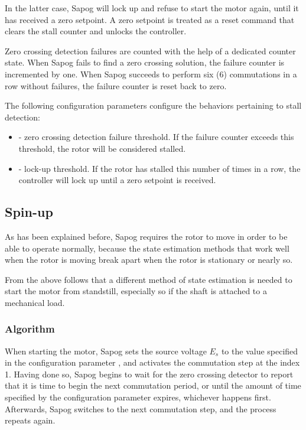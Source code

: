 \documentclass{zubaxdoc}
\begin{document}
In the latter case, Sapog will lock up and refuse to start the motor again,
until it has received a zero setpoint.
A zero setpoint is treated as a reset command that clears the stall counter and unlocks the controller.

Zero crossing detection failures are counted with the help of a dedicated counter state.
When Sapog fails to find a zero crossing solution,
the failure counter is incremented by one.
When Sapog succeeds to perform six (6) commutations in a row without failures,
the failure counter is reset back to zero.

The following configuration parameters configure the behaviors pertaining to stall detection:

\begin{itemize}
\item {} - zero crossing detection failure threshold.
If the failure counter exceeds this threshold, the rotor will be considered stalled.
\item {} - lock-up threshold.
If the rotor has stalled this number of times in a row,
the controller will lock up until a zero setpoint is received.
\end{itemize}

\subsection{Spin-up}

As has been explained before, Sapog requires the rotor to move in order to be able to operate normally,
because the state estimation methods that work well when the rotor is moving break apart when the rotor is
stationary or nearly so.

From the above follows that a different method of state estimation is needed to start the motor
from standstill, especially so if the shaft is attached to a mechanical load.

\subsubsection{Algorithm}

When starting the motor, Sapog sets the source voltage $E_s$ to the value specified in the
configuration parameter , and activates the commutation step at the index 1.
Having done so, Sapog begins to wait for the zero crossing detector to report that it is time to
begin the next commutation period, or until the amount of time specified by the configuration parameter
 expires, whichever happens first.
Afterwards, Sapog switches to the next commutation step, and the process repeats again.
\end{document}
